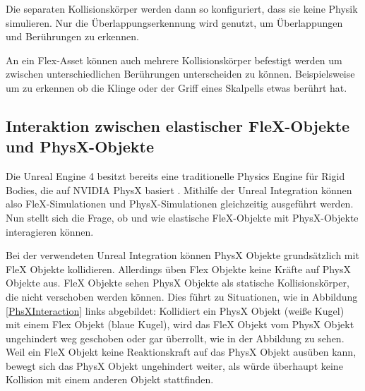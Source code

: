 
Die separaten Kollisionskörper werden dann so konfiguriert, dass sie keine Physik simulieren. Nur die Überlappungserkennung wird genutzt, um Überlappungen und Berührungen zu erkennen.

An ein Flex-Asset können auch mehrere Kollisionskörper befestigt werden um zwischen unterschiedlichen Berührungen unterscheiden zu können. Beispielsweise um zu erkennen ob die Klinge oder der Griff eines Skalpells etwas berührt hat.


  
\subsection{Interaktion zwischen elastischer FleX-Objekte und PhysX-Objekte}

 
Die Unreal Engine 4 besitzt bereits eine traditionelle Physics Engine für Rigid Bodies, die auf NVIDIA PhysX basiert \cite{ue4physics}. Mithilfe der Unreal Integration können also  FleX-Simulationen und PhysX-Simulationen gleichzeitig ausgeführt werden. Nun stellt sich die Frage, ob und wie elastische  FleX-Objekte mit PhysX-Objekte interagieren können.

Bei der verwendeten Unreal Integration können PhysX Objekte grundsätzlich mit FleX Objekte kollidieren. Allerdings üben Flex Objekte keine Kräfte auf PhysX Objekte aus. FleX Objekte sehen PhysX Objekte als statische Kollisionskörper, die nicht verschoben werden können. Dies führt zu Situationen, wie in Abbildung \ref{PhsXInteraction} links abgebildet: Kollidiert ein PhysX Objekt (weiße Kugel) mit einem Flex Objekt (blaue Kugel), wird das FleX Objekt vom PhysX Objekt ungehindert weg geschoben oder gar überrollt, wie in der Abbildung zu sehen. Weil ein FleX Objekt keine Reaktionskraft auf das PhysX Objekt ausüben kann, bewegt sich das PhysX Objekt ungehindert weiter, als würde überhaupt keine Kollision mit einem anderen Objekt stattfinden.

